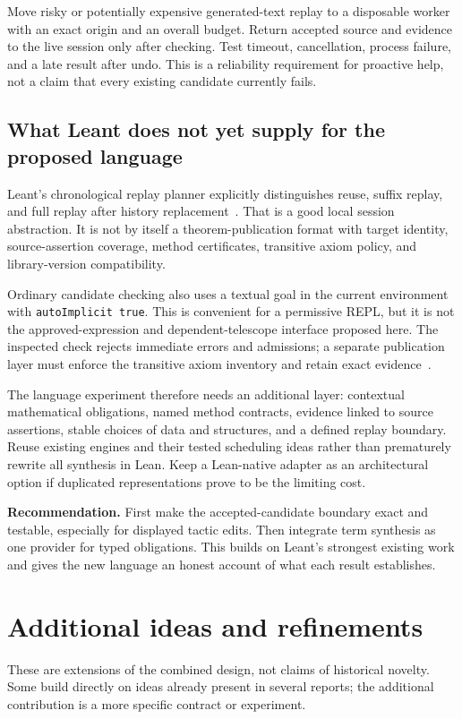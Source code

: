 \documentclass[11pt,letterpaper]{article}
\newcommand{\decision}[1]{\par\smallskip\noindent\textbf{Recommendation.} #1\par\smallskip}
\begin{document}
Move risky or potentially expensive generated-text replay to a disposable worker
with an exact origin and an overall budget. Return accepted source and evidence to
the live session only after checking. Test timeout, cancellation, process failure,
and a late result after undo. This is a reliability requirement for proactive help,
not a claim that every existing candidate currently fails.

\subsection{What Leant does not yet supply for the proposed language}
Leant's chronological replay planner explicitly distinguishes reuse, suffix replay,
and full replay after history replacement~\cite{l-replay}. That is a good local
session abstraction. It is not by itself a theorem-publication format with target
identity, source-assertion coverage, method certificates, transitive axiom policy,
and library-version compatibility.

Ordinary candidate checking also uses a textual goal in the current environment
with \texttt{autoImplicit true}. This is convenient for a permissive REPL, but it
is not the approved-expression and dependent-telescope interface proposed here.
The inspected check rejects immediate errors and admissions; a separate publication
layer must enforce the transitive axiom inventory and retain exact evidence~\cite{l-fragment,l-main}.

The language experiment therefore needs an additional layer: contextual mathematical
obligations, named method contracts, evidence linked to source assertions, stable
choices of data and structures, and a defined replay boundary. Reuse existing
engines and their tested scheduling ideas rather than prematurely rewrite all
synthesis in Lean. Keep a Lean-native adapter as an architectural option if
duplicated representations prove to be the limiting cost.

\decision{First make the accepted-candidate boundary exact and testable, especially
for displayed tactic edits. Then integrate term synthesis as one provider for
typed obligations. This builds on Leant's strongest existing work and gives the
new language an honest account of what each result establishes.}

\section{Additional ideas and refinements}\label{sec:new}
These are extensions of the combined design, not claims of historical novelty.
Some build directly on ideas already present in several reports; the additional
contribution is a more specific contract or experiment.
\end{document}
